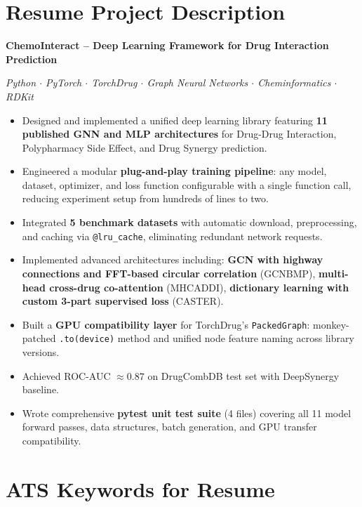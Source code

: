 \documentclass[12pt,a4paper,oneside]{book}
\begin{document}
\section{Resume Project Description}

\noindent\textbf{ChemoInteract -- Deep Learning Framework for Drug Interaction Prediction}

\noindent\textit{Python $\cdot$ PyTorch $\cdot$ TorchDrug $\cdot$ Graph Neural Networks $\cdot$ Cheminformatics $\cdot$ RDKit}

\begin{itemize}[leftmargin=*]
  \item Designed and implemented a unified deep learning library featuring \textbf{11 published GNN and MLP architectures} for Drug-Drug Interaction, Polypharmacy Side Effect, and Drug Synergy prediction.

  \item Engineered a modular \textbf{plug-and-play training pipeline}: any model, dataset, optimizer, and loss function configurable with a single function call, reducing experiment setup from hundreds of lines to two.

  \item Integrated \textbf{5 benchmark datasets} with automatic download, preprocessing, and caching via \texttt{@lru\_cache}, eliminating redundant network requests.

  \item Implemented advanced architectures including: \textbf{GCN with highway connections and FFT-based circular correlation} (GCNBMP), \textbf{multi-head cross-drug co-attention} (MHCADDI), \textbf{dictionary learning with custom 3-part supervised loss} (CASTER).

  \item Built a \textbf{GPU compatibility layer} for TorchDrug's \texttt{PackedGraph}: monkey-patched \texttt{.to(device)} method and unified node feature naming across library versions.

  \item Achieved ROC-AUC $\approx 0.87$ on DrugCombDB test set with DeepSynergy baseline.

  \item Wrote comprehensive \textbf{pytest unit test suite} (4 files) covering all 11 model forward passes, data structures, batch generation, and GPU transfer compatibility.
\end{itemize}

\section{ATS Keywords for Resume}
\end{document}
